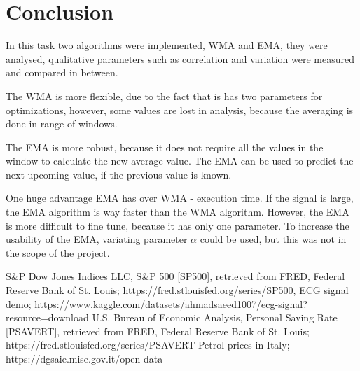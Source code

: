 \documentclass[a4paper,12pt,fleqn]{article}
\begin{document}
                \newpage
                \section{Conclusion}

                \hspace{1 em} In this task two algorithms were implemented, WMA and EMA, they were
                analysed, qualitative parameters such as correlation and variation were measured and compared in between. 

                The WMA is more flexible, due to the fact that is has two parameters for optimizations, however,
                some values are lost in analysis, because the averaging is done in range of windows.

                The EMA is more robust, because it does not require all the values in the window to calculate the new average value. 
                The EMA can be used to predict the next upcoming value, if the previous value is known.

                One huge advantage EMA has over WMA - execution time. If the signal is large, the EMA algorithm is way faster than the WMA algorithm.
                However, the EMA is more difficult to fine tune, because it has only one parameter. To increase the
                usability of the EMA, variating parameter $\alpha$ could be used, but this was not in the
                scope of the project.

        \newpage
        \begin{thebibliography}{99}
         S\&P Dow Jones Indices LLC, S\&P 500 [SP500], retrieved from FRED, Federal Reserve Bank of St. Louis; https://fred.stlouisfed.org/series/SP500, 
         ECG signal demo; https://www.kaggle.com/datasets/ahmadsaeed1007/ecg-signal?resource=download
        U.S. Bureau of Economic Analysis, Personal Saving Rate [PSAVERT], retrieved from FRED, Federal Reserve Bank of St. Louis; https://fred.stlouisfed.org/series/PSAVERT
        Petrol prices in Italy; https://dgsaie.mise.gov.it/open-data
    \end{thebibliography}
         
\end{document}
